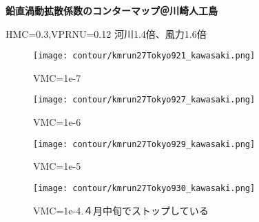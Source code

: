 \documentclass[fontsize=12pt,paper=a4]{jlreq}
\begin{document}
\textbf{鉛直渦動拡散係数のコンターマップ＠川崎人工島}

HMC=0.3,VPRNU=0.12 河川1.4倍、風力1.6倍
\begin{figure}
    \centering
    \texttt{[image: contour/kmrun27Tokyo921\_kawasaki.png]}
    \caption{VMC=1e-7}
\end{figure}

\begin{figure}
    \centering
    \texttt{[image: contour/kmrun27Tokyo927\_kawasaki.png]}
    \caption{VMC=1e-6}
\end{figure}

\begin{figure}
    \centering
    \texttt{[image: contour/kmrun27Tokyo929\_kawasaki.png]}
    \caption{VMC=1e-5}
\end{figure}

\begin{figure}
    \centering
    \texttt{[image: contour/kmrun27Tokyo930\_kawasaki.png]}
    \caption{VMC=1e-4.４月中旬でストップしている}
\end{figure}
\end{document}
